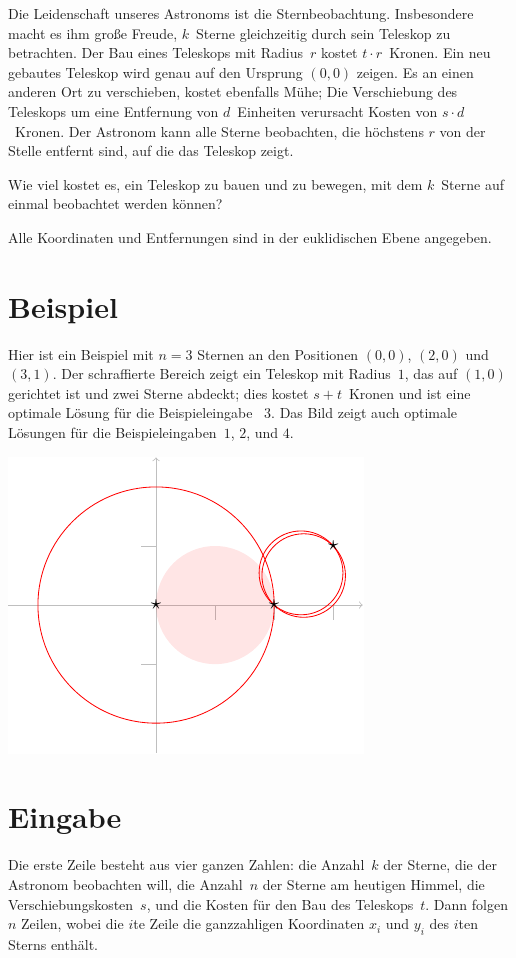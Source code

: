 
\noindent
Die Leidenschaft unseres Astronoms ist die Sternbeobachtung.
Insbesondere macht es ihm große Freude, $k$~Sterne gleichzeitig durch sein Teleskop zu betrachten.   
Der Bau eines Teleskops mit Radius~$r$ kostet $t\cdot r$~Kronen.
Ein neu gebautes Teleskop wird genau auf den Ursprung $(0,0)$ zeigen.
Es an einen anderen Ort zu verschieben, kostet ebenfalls Mühe; 
Die Verschiebung des Teleskops um eine Entfernung von $d$~Einheiten verursacht Kosten von $s\cdot d$~Kronen.
Der Astronom kann alle Sterne beobachten, die höchstens $r$ von der Stelle entfernt sind, auf die das Teleskop zeigt.

Wie viel kostet es, ein Teleskop zu bauen und zu bewegen, mit dem $k$~Sterne auf einmal beobachtet werden können?


\medskip

Alle Koordinaten und Entfernungen sind in der euklidischen Ebene angegeben.


\section*{Beispiel}

Hier ist ein Beispiel mit $n=3$ Sternen an den Positionen $(0,0)$, $(2,0)$ und $(3,1)$.
Der schraffierte Bereich zeigt ein Teleskop mit Radius~$1$, das auf $(1,0)$ gerichtet ist und zwei Sterne abdeckt; dies kostet $s + t$~Kronen und ist eine optimale Lösung für die Beispieleingabe ~$3$.
Das Bild zeigt auch optimale Lösungen für die Beispieleingaben~$1$, $2$, und $4$.

\medskip
\noindent
\includegraphics[width=.3\textwidth]{img/samples.pdf}


\section*{Eingabe}

Die erste Zeile besteht aus vier ganzen Zahlen:
die Anzahl~$k$ der Sterne, die der Astronom beobachten will,
die Anzahl~$n$ der Sterne am heutigen Himmel,
die Verschiebungskosten~$s$, und
die Kosten für den Bau des Teleskops~$t$.
Dann folgen $n$ Zeilen, wobei die $i$te Zeile die ganzzahligen Koordinaten $x_i$ und $y_i$ des $i$ten Sterns enthält.

